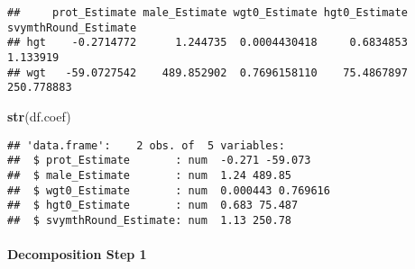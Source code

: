 \documentclass[
]{book}
\newenvironment{Shaded}{\begin{snugshade}}{\end{snugshade}}
\newcommand{\CommentTok}[1]{\textcolor[rgb]{0.56,0.35,0.01}{\textit{#1}}}
\newcommand{\DataTypeTok}[1]{\textcolor[rgb]{0.13,0.29,0.53}{#1}}
\newcommand{\DecValTok}[1]{\textcolor[rgb]{0.00,0.00,0.81}{#1}}
\newcommand{\KeywordTok}[1]{\textcolor[rgb]{0.13,0.29,0.53}{\textbf{#1}}}
\newcommand{\NormalTok}[1]{#1}
\newcommand{\OperatorTok}[1]{\textcolor[rgb]{0.81,0.36,0.00}{\textbf{#1}}}
\newcommand{\StringTok}[1]{\textcolor[rgb]{0.31,0.60,0.02}{#1}}
\begin{document}
\begin{verbatim}
##     prot_Estimate male_Estimate wgt0_Estimate hgt0_Estimate svymthRound_Estimate
## hgt    -0.2714772      1.244735  0.0004430418     0.6834853             1.133919
## wgt   -59.0727542    489.852902  0.7696158110    75.4867897           250.778883
\end{verbatim}

\begin{Shaded}
\begin{Highlighting}[]
\KeywordTok{str}\NormalTok{(df.coef)}
\end{Highlighting}
\end{Shaded}

\begin{verbatim}
## 'data.frame':    2 obs. of  5 variables:
##  $ prot_Estimate       : num  -0.271 -59.073
##  $ male_Estimate       : num  1.24 489.85
##  $ wgt0_Estimate       : num  0.000443 0.769616
##  $ hgt0_Estimate       : num  0.683 75.487
##  $ svymthRound_Estimate: num  1.13 250.78
\end{verbatim}

\hypertarget{decomposition-step-1}{%
\paragraph{Decomposition Step 1}\label{decomposition-step-1}}

\begin{Shaded}
\end{Shaded}
\end{document}
